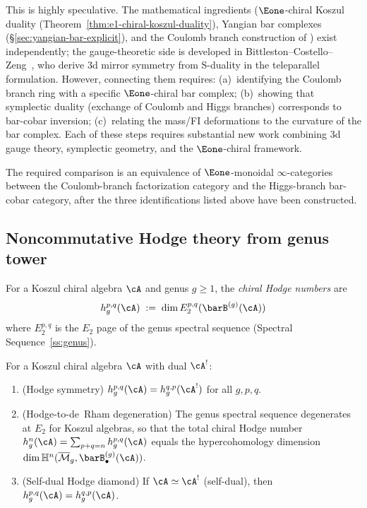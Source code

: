 \begin{remark}[Scope]\label{rem:3d-mirror-scope}
This is highly speculative. The mathematical ingredients
($\Eone$-chiral Koszul duality
(Theorem~\ref{thm:e1-chiral-koszul-duality}), Yangian bar
complexes (\S\ref{sec:yangian-bar-explicit}), and the
Coulomb branch construction of \cite{BFN18}) exist
independently; the gauge-theoretic side is developed in
Bittleston--Costello--Zeng~\cite{BittlestonCostelloZeng24},
who derive 3d mirror symmetry from S-duality in the
teleparallel formulation. However, connecting them requires: (a)~identifying
the Coulomb branch ring with a specific $\Eone$-chiral bar
complex; (b)~showing that symplectic duality (exchange of Coulomb
and Higgs branches) corresponds to bar-cobar inversion; (c)~relating
the mass/FI deformations to the curvature of the bar complex.
Each of these steps requires substantial new work combining
3d gauge theory, symplectic geometry, and the $\Eone$-chiral
framework.

The required comparison is an equivalence of $\Eone$-monoidal
$\infty$-categories between the Coulomb-branch factorization category
and the Higgs-branch bar-cobar category, after the three identifications
listed above have been constructed.
\end{remark}

\subsection{Noncommutative Hodge theory from genus tower}
\label{subsec:nc-hodge}

\begin{definition}\label{def:chiral-hodge-numbers}
For a Koszul chiral algebra $\cA$ and genus $g \geq 1$, the
\emph{chiral Hodge numbers} are
\[
h^{p,q}_g(\cA)
\;:=\;
\dim E_2^{p,q}(\barB^{(g)}(\cA))
\]
where $E_2^{p,q}$ is the $E_2$ page of the genus spectral
sequence (Spectral Sequence~\ref{ss:genus}).
\end{definition}

\begin{proposition}\label{prop:nc-hodge-symmetry}
For a Koszul chiral algebra $\cA$ with dual $\cA^!$:
\begin{enumerate}[label=\textup{(\roman*)}]
\item \textup{(Hodge symmetry)}
 $h^{p,q}_g(\cA) = h^{q,p}_g(\cA^!)$ for all $g, p, q$.
\item \textup{(Hodge-to-de~Rham degeneration)}
 The genus spectral sequence degenerates at $E_2$
 for Koszul algebras, so that the total chiral Hodge number
 $h^n_g(\cA) = \sum_{p+q=n} h^{p,q}_g(\cA)$
 equals the hypercohomology dimension
 $\dim \mathbb{H}^n(\overline{\mathcal{M}}_g,
 \barB^{(g)}_\bullet(\cA))$.
\item \textup{(Self-dual Hodge diamond)}
 If $\cA \simeq \cA^!$ \textup{(}self-dual\textup{)},
 then $h^{p,q}_g(\cA) = h^{q,p}_g(\cA)$.
\end{enumerate}
\end{proposition}

